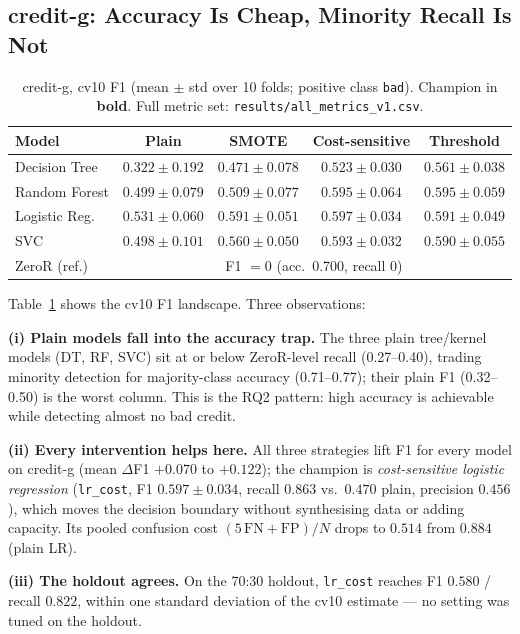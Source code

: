 \subsection{credit-g: Accuracy Is Cheap, Minority Recall Is Not}
\label{sec:results-creditg}

\begin{table}[H]
\centering
\caption{credit-g, cv10 F1 (mean $\pm$ std over 10 folds; positive class \texttt{bad}). Champion in \textbf{bold}. Full metric set: \texttt{results/all\_metrics\_v1.csv}.}
\label{tab:creditg-f1}
\begin{tabular}{lcccc}
\toprule
Model & Plain & SMOTE & Cost-sensitive & Threshold \\
\midrule
Decision Tree & $0.322\pm0.192$ & $0.471\pm0.078$ & $0.523\pm0.030$ & $0.561\pm0.038$ \\
Random Forest & $0.499\pm0.079$ & $0.509\pm0.077$ & $0.595\pm0.064$ & $0.595\pm0.059$ \\
Logistic Reg. & $0.531\pm0.060$ & $0.591\pm0.051$ & $\mathbf{0.597\pm0.034}$ & $0.591\pm0.049$ \\
SVC & $0.498\pm0.101$ & $0.560\pm0.050$ & $0.593\pm0.032$ & $0.590\pm0.055$ \\
\midrule
ZeroR (ref.) & \multicolumn{4}{c}{F1 $=0$ (acc.\ 0.700, recall 0)} \\
\bottomrule
\end{tabular}
\end{table}

Table~\ref{tab:creditg-f1} shows the cv10 F1 landscape. Three observations:

\textbf{(i) Plain models fall into the accuracy trap.} The three plain tree/kernel models (DT, RF, SVC) sit at or below ZeroR-level recall (0.27--0.40), trading minority detection for majority-class accuracy (0.71--0.77); their plain F1 (0.32--0.50) is the worst column. This is the RQ2 pattern: high accuracy is achievable while detecting almost no bad credit.

\textbf{(ii) Every intervention helps here.} All three strategies lift F1 for every model on credit-g (mean $\Delta$F1 $+0.070$ to $+0.122$); the champion is \emph{cost-sensitive logistic regression} (\texttt{lr\_cost}, F1 $0.597\pm0.034$, recall $0.863$ vs.\ $0.470$ plain, precision $0.456$), which moves the decision boundary without synthesising data or adding capacity. Its pooled confusion cost $(5\,\mathrm{FN}+\mathrm{FP})/N$ drops to $0.514$ from $0.884$ (plain LR).

\textbf{(iii) The holdout agrees.} On the 70:30 holdout, \texttt{lr\_cost} reaches F1 $0.580$ / recall $0.822$, within one standard deviation of the cv10 estimate --- no setting was tuned on the holdout.

